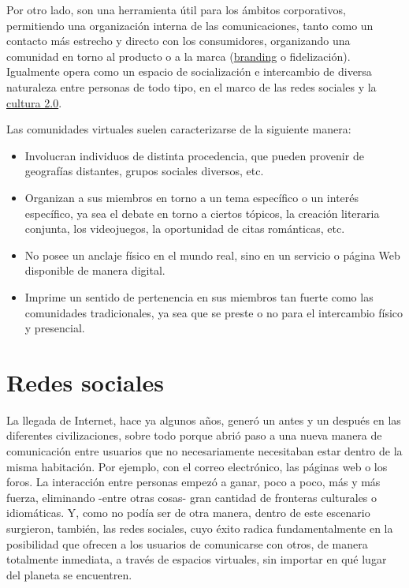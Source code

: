 Por otro lado, son una herramienta útil para los ámbitos corporativos, permitiendo una organización interna de las comunicaciones, tanto como un contacto más estrecho y directo con los consumidores, organizando una comunidad en torno al producto o a la marca (\href{https://rockcontent.com/es/blog/branding/}{branding} o fidelización). Igualmente opera como un espacio de socialización e intercambio de diversa naturaleza entre personas de todo tipo, en el marco de las redes sociales y la \href{https://comunidad.iebschool.com/culturaempresarial/2016/11/21/la-cultura-2-0/#:~:text=La\%20Cultura\%202.0\%20o\%20digital,sino\%20de\%20valores\%20y\%20de}{cultura 2.0}.

Las comunidades virtuales suelen caracterizarse de la siguiente manera:
\begin{itemize}
    \item Involucran individuos de distinta procedencia, que pueden provenir de geografías distantes, grupos sociales diversos, etc.
    \item Organizan a sus miembros en torno a un tema específico o un interés específico, ya sea el debate en torno a ciertos tópicos, la creación literaria conjunta, los videojuegos, la oportunidad de citas románticas, etc.
    \item No posee un anclaje físico en el mundo real, sino en un servicio o página Web disponible de manera digital.
    \item Imprime un sentido de pertenencia en sus miembros tan fuerte como las comunidades tradicionales, ya sea que se preste o no para el intercambio físico y presencial.
\end{itemize}

\section{Redes sociales}

La llegada de Internet, hace ya algunos años, generó un antes y un después en las diferentes civilizaciones, sobre todo porque abrió paso a una nueva manera de comunicación entre usuarios que no necesariamente necesitaban estar dentro de la misma habitación. Por ejemplo, con el correo electrónico, las páginas web o los foros. La interacción entre personas empezó a ganar, poco a poco, más y más fuerza, eliminando -entre otras cosas- gran cantidad de fronteras culturales o idiomáticas. Y, como no podía ser de otra manera, dentro de este escenario surgieron, también, las redes sociales, cuyo éxito radica fundamentalmente en la posibilidad que ofrecen a los usuarios de comunicarse con otros, de manera totalmente inmediata, a través de espacios virtuales, sin importar en qué lugar del planeta se encuentren.

